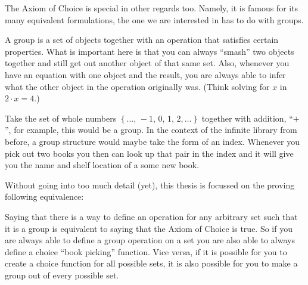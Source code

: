 \documentclass[../../main.tex]{subfiles}
\begin{document}
The Axiom of Choice is special in other regards too.
Namely, it is famous for its many equivalent formulations, the one we are interested in has to do with groups.

A group is a set of objects together with an operation that satisfies certain properties.
What is important here is that you can always ``smash'' two objects together and still get out another object of that same set.
Also, whenever you have an equation with one object and the result, you are always able to infer what the other object in the operation originally was.
(Think solving for $x$ in $2 \cdot x = 4$.)

Take the set of whole numbers $\left\{\ldots,\, -1,\, 0,\, 1,\, 2,\ldots\right\}$ together with addition, ``$+$'', for example, this would be a group.
In the context of the infinite library from before, a group structure would maybe take the form of an index.
Whenever you pick out two books you then can look up that pair in the index and it will give you the name and shelf location of a some new book.

Without going into too much detail (yet), this thesis is focussed on the proving following equivalence:

Saying that there is a way to define an operation for any arbitrary set such that it is a group is equivalent to saying that the Axiom of Choice is true.
So if you are always able to define a group operation on a set you are also able to always define a choice ``book picking'' function.
Vice versa, if it is possible for you to create a choice function for all possible sets, 
it is also possible for you to make a group out of every possible set.
\end{document}
